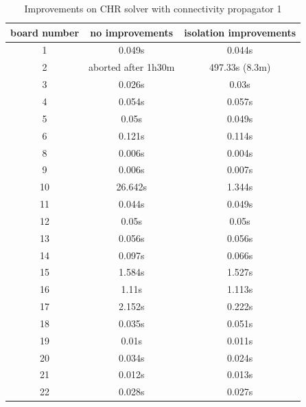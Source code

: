 \documentclass{report}
\begin{document}
\begin{table}[h]
\centering
\begin{tabular}{|c|c|c|}
\hline
    board number & no improvements & isolation improvements\\
    \hline
        1   & 0.049s & 0.044s \\
        2   & aborted after 1h30m & 497.33s (8.3m) \\
        3   & 0.026s & 0.03s \\
        4   & 0.054s & 0.057s \\
        5   & 0.05s & 0.049s \\
        6   & 0.121s & 0.114s \\
        8   & 0.006s & 0.004s \\
        9   & 0.006s & 0.007s \\
        10  & 26.642s & 1.344s \\
        11  & 0.044s & 0.049s \\
        12  & 0.05s & 0.05s \\
        13  & 0.056s & 0.056s \\
        14  & 0.097s & 0.066s \\
        15  & 1.584s & 1.527s \\
        16  & 1.11s & 1.113s \\
        17  & 2.152s & 0.222s \\
        18  & 0.035s & 0.051s \\
        19  & 0.01s & 0.011s \\
        20  & 0.034s & 0.024s \\
        21  & 0.012s & 0.013s \\
        22  & 0.028s & 0.027s \\
    \hline
\end{tabular}
\caption{Improvements on CHR solver with connectivity propagator 1}
\end{table}
\end{document}

